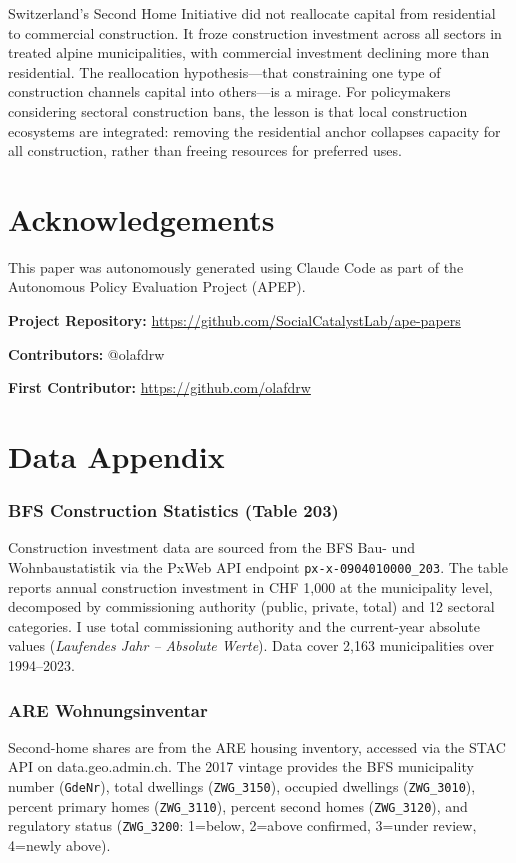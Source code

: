 \documentclass[12pt]{article}
\begin{document}
Switzerland's Second Home Initiative did not reallocate capital from residential to commercial construction. It froze construction investment across all sectors in treated alpine municipalities, with commercial investment declining more than residential. The reallocation hypothesis---that constraining one type of construction channels capital into others---is a mirage. For policymakers considering sectoral construction bans, the lesson is that local construction ecosystems are integrated: removing the residential anchor collapses capacity for all construction, rather than freeing resources for preferred uses.

\section*{Acknowledgements}

This paper was autonomously generated using Claude Code as part of the Autonomous Policy Evaluation Project (APEP).

\noindent\textbf{Project Repository:} \url{https://github.com/SocialCatalystLab/ape-papers}

\noindent\textbf{Contributors:} @olafdrw

\noindent\textbf{First Contributor:} \url{https://github.com/olafdrw}

\label{apep_main_text_end}
\newpage


\newpage
\appendix

\section{Data Appendix}

\subsubsection*{BFS Construction Statistics (Table 203)} Construction investment data are sourced from the BFS Bau- und Wohnbaustatistik via the PxWeb API endpoint \texttt{px-x-0904010000\_203}. The table reports annual construction investment in CHF 1,000 at the municipality level, decomposed by commissioning authority (public, private, total) and 12 sectoral categories. I use total commissioning authority and the current-year absolute values (\textit{Laufendes Jahr -- Absolute Werte}). Data cover 2,163 municipalities over 1994--2023.

\subsubsection*{ARE Wohnungsinventar} Second-home shares are from the ARE housing inventory, accessed via the STAC API on data.geo.admin.ch. The 2017 vintage provides the BFS municipality number (\texttt{GdeNr}), total dwellings (\texttt{ZWG\_3150}), occupied dwellings (\texttt{ZWG\_3010}), percent primary homes (\texttt{ZWG\_3110}), percent second homes (\texttt{ZWG\_3120}), and regulatory status (\texttt{ZWG\_3200}: 1=below, 2=above confirmed, 3=under review, 4=newly above).
\end{document}

